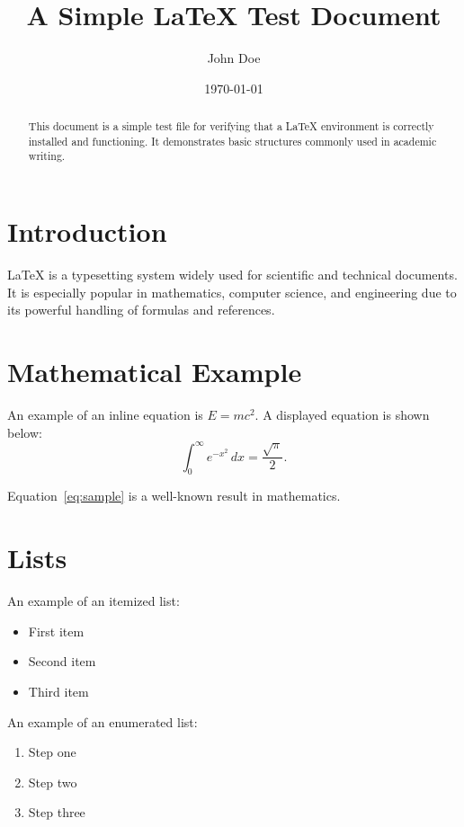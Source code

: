 \documentclass[12pt,a4paper]{article}
\title{A Simple \LaTeX{} Test Document}
\author{John Doe}
\date{\today}
\begin{document}
\maketitle

\begin{abstract}
This document is a simple test file for verifying that a \LaTeX{} environment
is correctly installed and functioning. It demonstrates basic structures
commonly used in academic writing.
\end{abstract}

\section{Introduction}

\LaTeX{} is a typesetting system widely used for scientific and technical
documents. It is especially popular in mathematics, computer science,
and engineering due to its powerful handling of formulas and references.

\section{Mathematical Example}

An example of an inline equation is $E = mc^2$.
A displayed equation is shown below:
\begin{equation}
\label{eq:sample}
\int_{0}^{\infty} e^{-x^2} \, dx = \frac{\sqrt{\pi}}{2}.
\end{equation}

Equation~\ref{eq:sample} is a well-known result in mathematics.

\section{Lists}

An example of an itemized list:
\begin{itemize}
  \item First item
  \item Second item
  \item Third item
\end{itemize}

An example of an enumerated list:
\begin{enumerate}
  \item Step one
  \item Step two
  \item Step three
\end{enumerate}
\end{document}
